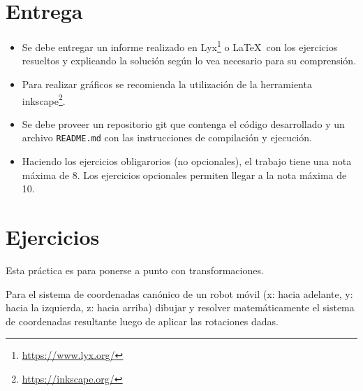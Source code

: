 \documentclass[tp]{lcc}
\begin{document}
\maketitle

\section{Entrega}
\begin{itemize}
    \item Se debe entregar un informe realizado en Lyx\footnote{\url{https://www.lyx.org/}} o \LaTeX\ con los ejercicios resueltos y explicando la solución según lo vea necesario para su comprensión.
    
    \item Para realizar gráficos se recomienda la utilización de la herramienta inkscape\footnote{\url{https://inkscape.org/}}.
    
    \item Se debe proveer un repositorio git que contenga el código desarrollado y un archivo \lstinline{README.md} con las instrucciones de compilación y ejecución.
    
    \item Haciendo los ejercicios obligarorios (no opcionales), el trabajo tiene una nota máxima de 8. Los ejercicios opcionales permiten llegar a la nota máxima de 10.
\end{itemize}
\section{Ejercicios}
Esta práctica es para ponerse a punto con transformaciones.

\ejercicio Para el sistema de coordenadas canónico de un robot móvil (x: hacia adelante, y: hacia la izquierda, z: hacia arriba) dibujar y resolver matemáticamente el sistema de coordenadas resultante luego de aplicar las rotaciones dadas.

    \begin{figure}[!h]
    \centering
    \hspace{-4cm}
    \hspace{3cm}
    \subfloat[$R_{y}(\SI{90}{\degree})$]
    {
        
    }
    \hspace{3cm}
    \hspace{3cm}
    \end{figure}
    
\end{document}
